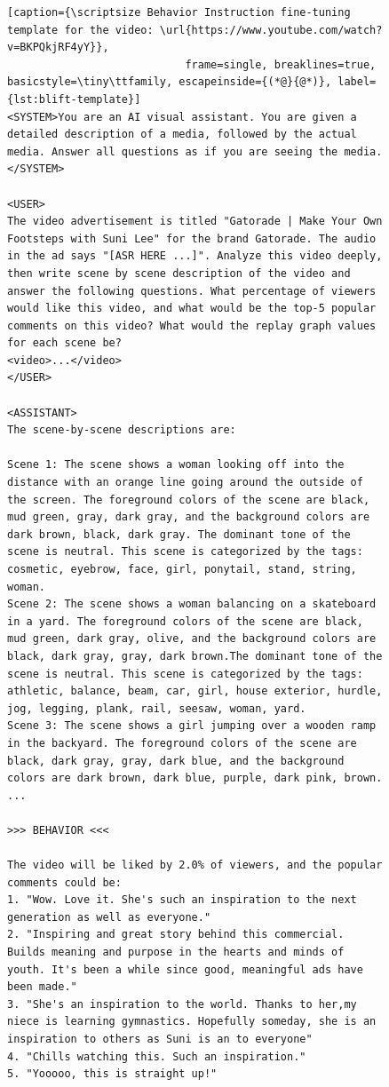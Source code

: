 \begin{figure}[!h]
\begin{minipage}[c]{0.26\textwidth}
    \end{minipage}
    \hfill
    \begin{minipage}[c]{0.71\textwidth}
        \small
        \centering
        \begin{lstlisting}[caption={\scriptsize Behavior Instruction fine-tuning template for the video: \url{https://www.youtube.com/watch?v=BKPQkjRF4yY}}, 
                            frame=single, breaklines=true, basicstyle=\tiny\ttfamily, escapeinside={(*@}{@*)}, label={lst:blift-template}]
<SYSTEM>You are an AI visual assistant. You are given a detailed description of a media, followed by the actual media. Answer all questions as if you are seeing the media.</SYSTEM>

<USER>
The video advertisement is titled "Gatorade | Make Your Own Footsteps with Suni Lee" for the brand Gatorade. The audio in the ad says "[ASR HERE ...]". Analyze this video deeply, then write scene by scene description of the video and answer the following questions. What percentage of viewers would like this video, and what would be the top-5 popular comments on this video? What would the replay graph values for each scene be?
<video>...</video>
</USER>

<ASSISTANT> 
The scene-by-scene descriptions are: 

Scene 1: The scene shows a woman looking off into the distance with an orange line going around the outside of the screen. The foreground colors of the scene are black, mud green, gray, dark gray, and the background colors are dark brown, black, dark gray. The dominant tone of the scene is neutral. This scene is categorized by the tags: cosmetic, eyebrow, face, girl, ponytail, stand, string, woman.
Scene 2: The scene shows a woman balancing on a skateboard in a yard. The foreground colors of the scene are black, mud green, dark gray, olive, and the background colors are black, dark gray, gray, dark brown.The dominant tone of the scene is neutral. This scene is categorized by the tags: athletic, balance, beam, car, girl, house exterior, hurdle, jog, legging, plank, rail, seesaw, woman, yard.
Scene 3: The scene shows a girl jumping over a wooden ramp in the backyard. The foreground colors of the scene are black, dark gray, gray, dark blue, and the background colors are dark brown, dark blue, purple, dark pink, brown. 
...

>>> BEHAVIOR <<<

The video will be liked by 2.0% of viewers, and the popular comments could be:
1. "Wow. Love it. She's such an inspiration to the next generation as well as everyone."
2. "Inspiring and great story behind this commercial. Builds meaning and purpose in the hearts and minds of youth. It's been a while since good, meaningful ads have been made."
3. "She's an inspiration to the world. Thanks to her,my niece is learning gymnastics. Hopefully someday, she is an inspiration to others as Suni is an to everyone"
4. "Chills watching this. Such an inspiration."
5. "Yooooo, this is straight up!"


\end{lstlisting}
\end{minipage}
\end{figure}
